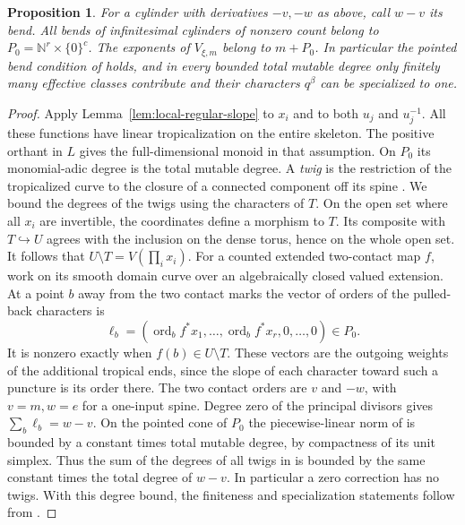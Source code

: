 \documentclass[11pt,reqno]{amsart}
\numberwithin{equation}{section}
\newtheorem{proposition}[theorem]{Proposition}
\theoremstyle{definition}
\theoremstyle{remark}
\begin{document}
\begin{proposition}\label{prop:local-bend-cone}
For a cylinder with derivatives \(-v,-w\) as above, call \(w-v\)
its \emph{bend}. All bends of infinitesimal cylinders of nonzero count belong to
\(P_0=\mathbb N^r\times\{0\}^c\). The exponents of \(V_{\xi,m}\)
belong to \(m+P_0\). In particular the pointed bend condition of
\cite[Assumption~20.27]{KY} holds, and in every bounded total mutable
degree only finitely many effective classes contribute and their characters
\(q^\beta\) can be specialized to one.
\end{proposition}
\begin{proof}
Apply Lemma~\ref{lem:local-regular-slope} to \(x_i\) and to both
\(u_j\) and \(u_j^{-1}\). All these functions have linear
tropicalization on the entire skeleton. The positive orthant in \(L\) gives the full-dimensional monoid in
that assumption. On \(P_0\) its monomial-adic degree is the total mutable degree.
A \emph{twig} is the restriction of the tropicalized curve to the
closure of a connected component off its spine
\cite[Definition~4.22]{KY}. We bound the degrees of the twigs using
the characters of \(T\).
On the open set where all \(x_i\) are invertible, the coordinates
define a morphism to \(T\). Its composite with \(T\hookrightarrow U\)
agrees with the inclusion on the dense torus, hence on the whole open set. It follows that \(U\setminus T=V(\prod_i x_i)\).
For a counted extended two-contact map \(f\), work on its smooth domain
curve over an algebraically closed valued extension. At a point \(b\) away
from the two contact marks the vector of orders of the pulled-back
characters is
\[ \ell_b=(\operatorname{ord}_b f^*x_1,\ldots, \operatorname{ord}_b f^*x_r,0,\ldots,0)\in P_0. \]
It is nonzero exactly when \(f(b)\in U\setminus T\). These vectors
are the outgoing weights of the additional tropical ends, since the
slope of each character toward such a puncture is its order there.
The two contact orders are \(v\) and \(-w\), with \(v=m,w=e\) for
a one-input spine. Degree zero of the principal divisors gives
\(\sum_b\ell_b=w-v\). On the pointed cone of \(P_0\) the
piecewise-linear norm of \cite[Definition~4.11]{KY} is bounded by
a constant times total mutable degree, by compactness of its unit
simplex. Thus the sum of the degrees of all twigs in
\cite[Definition~4.12]{KY} is bounded by the same constant times
the total degree of \(w-v\). In particular a zero correction has no twigs. With this degree bound,
the finiteness and specialization statements follow from
\cite[Lemmas~20.29--20.31 and Definition~20.32]{KY}.
\end{proof}
\end{document}
